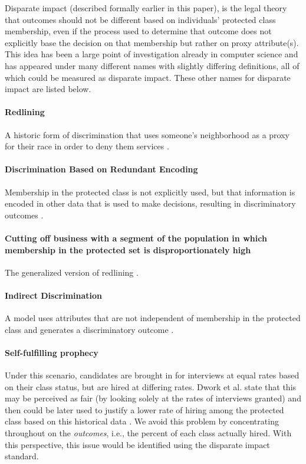 Disparate impact (described formally earlier in this paper), is the legal theory that outcomes should not be different based on individuals' protected class membership, even if the process used to determine that outcome does not explicitly base the decision on that membership but rather on proxy attribute(s).  This idea has been a large point of investigation already in computer science and has appeared under many different names with slightly differing definitions, all of which could be measured as disparate impact.  These other names for disparate impact are listed below.

\paragraph{Redlining}  A historic form of discrimination that uses someone's neighborhood as a proxy for their race in order to deny them services \cite{Dwork12Fairness, Kamishima12Fairness, Calders10NaiveBayes}.

\paragraph{Discrimination Based on Redundant Encoding}  Membership in the protected class is not explicitly used, but that information is encoded in other data that is used to make decisions, resulting in discriminatory outcomes \cite{Dwork12Fairness}.

\paragraph{Cutting off business with a segment of the population in which membership in the protected set
is disproportionately high}  The generalized version of redlining \cite{Dwork12Fairness}.

\paragraph{Indirect Discrimination} A model uses attributes that are not independent of membership in the protected class and generates a discriminatory outcome \cite{Kamishima12Fairness}.

\paragraph{Self-fulfilling prophecy}  
Under this scenario, candidates are brought in for interviews at equal rates based on their class status, but are hired at differing rates.  Dwork et al. state that this may be perceived as fair (by looking solely at the rates of interviews granted) and then could be later used to justify a lower rate of hiring among the protected class based on this historical data \cite{Dwork12Fairness}.  We avoid this problem by concentrating throughout on the \emph{outcomes}, i.e., the percent of each class actually hired.  With this perspective, this issue would be identified using the disparate impact standard.

